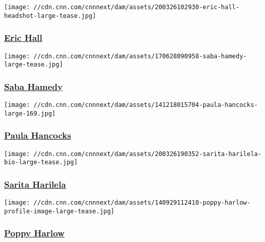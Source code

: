 \href{/profiles/eric-hall-profile}{}

\texttt{[image: //cdn.cnn.com/cnnnext/dam/assets/200326102930-eric-hall-headshot-large-tease.jpg]}

\hypertarget{eric-hall}{%
\subsubsection{\texorpdfstring{\href{/profiles/eric-hall-profile}{Eric
Hall}}{Eric Hall}}\label{eric-hall}}

\href{/profiles/saba-hamedy}{}

\texttt{[image: //cdn.cnn.com/cnnnext/dam/assets/170628090958-saba-hamedy-large-tease.jpg]}

\hypertarget{saba-hamedy}{%
\subsubsection{\texorpdfstring{\href{/profiles/saba-hamedy}{Saba
Hamedy}}{Saba Hamedy}}\label{saba-hamedy}}

\href{/profiles/paula-hancocks}{}

\texttt{[image: //cdn.cnn.com/cnnnext/dam/assets/141218015704-paula-hancocks-large-169.jpg]}

\hypertarget{paula-hancocks}{%
\subsubsection{\texorpdfstring{\href{/profiles/paula-hancocks}{Paula
Hancocks}}{Paula Hancocks}}\label{paula-hancocks}}

\href{/profiles/sarita-harilela}{}

\texttt{[image: //cdn.cnn.com/cnnnext/dam/assets/200326190352-sarita-harilela-bio-large-tease.jpg]}

\hypertarget{sarita-harilela}{%
\subsubsection{\texorpdfstring{\href{/profiles/sarita-harilela}{Sarita
Harilela}}{Sarita Harilela}}\label{sarita-harilela}}

\href{/profiles/poppy-harlow-profile}{}

\texttt{[image: //cdn.cnn.com/cnnnext/dam/assets/140929112410-poppy-harlow-profile-image-large-tease.jpg]}

\hypertarget{poppy-harlow}{%
\subsubsection{\texorpdfstring{\href{/profiles/poppy-harlow-profile}{Poppy
Harlow}}{Poppy Harlow}}\label{poppy-harlow}}

